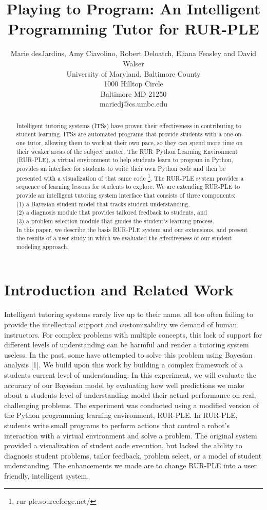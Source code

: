 \documentclass[twocolumn]{article}
\title{Playing to Program:  An Intelligent Programming Tutor for RUR-PLE}
\author{Marie desJardins, Amy Ciavolino, Robert Deloatch, Eliana Feasley and David Walser \\
University of Maryland, Baltimore County \\ 
1000 Hilltop Circle \\
Baltimore MD  21250 \\
mariedj@cs.umbc.edu
}
\begin{document}
\maketitle

\begin{abstract}
Intelligent tutoring systems (ITSs) have proven their effectiveness in contributing to student learning.  ITSs are automated programs that provide students with a one-on-one tutor, allowing them to work at their own pace, so they can spend more time on their weaker areas of the subject matter. The RUR--Python Learning Environment (RUR-PLE), a virtual environment to help students learn to program in Python, provides an interface for students to write their own Python code and then be presented with a visualization of that same code \footnote[1]{rur-ple.sourceforge.net/}.  The RUR-PLE system provides a sequence of learning lessons for students to explore.  We are extending RUR-PLE to provide an intelligent tutoring system interface that consists of three components:\\
(1) a Bayesian student model that tracks student understanding,\\
(2) a diagnosis module that provides tailored feedback to students, and\\
(3) a problem selection module that guides the student's learning process.\\  In this paper, we
describe the basis RUR-PLE system and our extensions, and present the
results of a user study in which we evaluated the effectiveness of our student modeling approach.
\end{abstract}

\section{Introduction and  Related Work}
\label{sec:intro}

Intelligent tutoring systems rarely live up to their name, all too often failing to provide the intellectual support and customizability we demand of human instructors.  For complex problems with multiple concepts, this lack of support for different levels of understanding can be harmful and render a tutoring system useless.  In the past, some have attempted to solve this problem using Bayesian analysis [1].  We build upon this work by building a complex framework of a students current level of understanding.  In this experiment, we will evaluate the accuracy of our Bayesian model by evaluating how well predictions we make about a students level of understanding model their actual performance on real, challenging problems.
The experiment was conducted using a modified version of the Python programming learning environment, RUR-PLE. In RUR-PLE, students write small programs to perform actions that control a robot’s interaction with a virtual environment and solve a problem. The original system provided a visualization of student code execution, but lacked the ability to diagnosis student problems, tailor feedback, problem select, or a model of student understanding. The enhancements we made are to change RUR-PLE into a user friendly, intelligent system.
\end{document}
